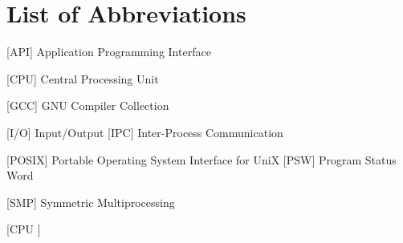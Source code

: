 
\chapter*{List of Abbreviations}

\begin{acronym} [CPU ]
 [API] {Application Programming Interface}


 [CPU] {Central Processing Unit}




 [GCC] {GNU Compiler Collection}


 [I/O] {Input/Output}
[IPC] {Inter-Process Communication}







 [POSIX] {Portable Operating System Interface for UniX}
 [PSW] {Program Status Word}



 [SMP] {Symmetric Multiprocessing}








\end{acronym} [CPU ]
